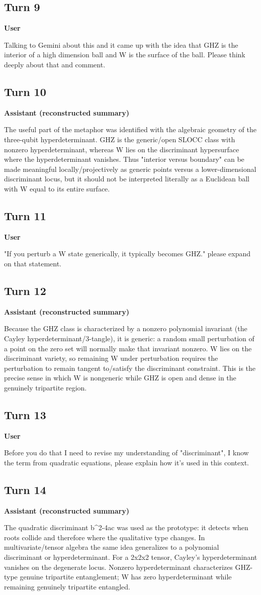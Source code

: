 \documentclass[11pt,a4paper]{article}
\newcommand{\speaker}[1]{\par\medskip\noindent\textbf{\large #1}\par\smallskip}
\begin{document}
\subsection*{Turn 9}
\speaker{User}
Talking to Gemini about this and it came up with the idea that GHZ is the interior of a high dimension ball and W is the surface of the ball. Please think deeply about that and comment.
\subsection*{Turn 10}
\speaker{Assistant (reconstructed summary)}
The useful part of the metaphor was identified with the algebraic geometry of the three-qubit hyperdeterminant. GHZ is the generic/open SLOCC class with nonzero hyperdeterminant, whereas W lies on the discriminant hypersurface where the hyperdeterminant vanishes. Thus "interior versus boundary" can be made meaningful locally/projectively as generic points versus a lower-dimensional discriminant locus, but it should not be interpreted literally as a Euclidean ball with W equal to its entire surface.
\subsection*{Turn 11}
\speaker{User}
"If you perturb a W state generically, it typically becomes GHZ." please expand on that statement.
\subsection*{Turn 12}
\speaker{Assistant (reconstructed summary)}
Because the GHZ class is characterized by a nonzero polynomial invariant (the Cayley hyperdeterminant/3-tangle), it is generic: a random small perturbation of a point on the zero set will normally make that invariant nonzero. W lies on the discriminant variety, so remaining W under perturbation requires the perturbation to remain tangent to/satisfy the discriminant constraint. This is the precise sense in which W is nongeneric while GHZ is open and dense in the genuinely tripartite region.
\subsection*{Turn 13}
\speaker{User}
Before you do that I need to revise my understanding of "discriminant", I know the term from quadratic equations, please explain how it's used in this context.
\subsection*{Turn 14}
\speaker{Assistant (reconstructed summary)}
The quadratic discriminant b\textasciicircum{}2-4ac was used as the prototype: it detects when roots collide and therefore where the qualitative type changes. In multivariate/tensor algebra the same idea generalizes to a polynomial discriminant or hyperdeterminant. For a 2x2x2 tensor, Cayley's hyperdeterminant vanishes on the degenerate locus. Nonzero hyperdeterminant characterizes GHZ-type genuine tripartite entanglement; W has zero hyperdeterminant while remaining genuinely tripartite entangled.
\end{document}
